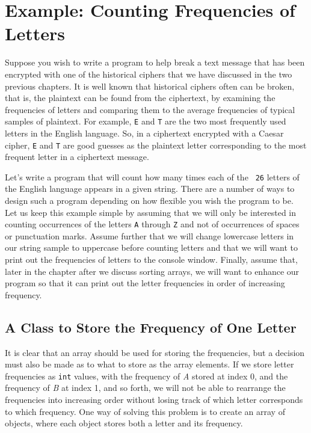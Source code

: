 \section{Example: Counting Frequencies of Letters}
\noindent Suppose you wish to write a program to help break a text
message that has been encrypted with one of the historical ciphers
that we have discussed in the two previous chapters.  It is well known
that historical ciphers often can be broken, that is, the plaintext
can be found from the ciphertext, by examining the frequencies of
letters and comparing them to the average frequencies of typical
samples of plaintext.  For example, {\tt E} and {\tt T} are the two
most frequently used letters in the English language. So, in a
ciphertext encrypted with a Caesar cipher, {\tt E} and {\tt T} are
good guesses as the plaintext letter corresponding to the most
frequent letter in a ciphertext message.

Let's write a program that will count how many times each of the {\tt
26} letters of the English language appears in a given string.  There
are a number of ways to design such a program depending on how
flexible you wish the program to be.  Let us keep this example simple
by assuming that we will only be interested in counting occurrences of
the letters {\tt A} through {\tt Z} and not of occurrences of spaces
or punctuation marks.  Assume further that we will change lowercase
letters in our string sample to uppercase before counting letters and
that we will want to print out the frequencies of letters to the
console window.  Finally, assume that, later in the chapter after we
discuss sorting arrays, we will want to enhance our program so that it
can print out the letter frequencies in order of increasing frequency.

\subsection{A Class to Store the Frequency of One Letter}

\noindent It is clear that an array should be used for storing the
frequencies, but a decision must also be made as to what to store as the
array elements.  If we store letter frequencies as {\tt int} values,
with the frequency of {\em A} stored at index 0, and the frequency of
{\em B} at index 1, and so forth, we will not be able to rearrange the
frequencies into increasing order without losing track of which letter
corresponds to which frequency.  One way of solving this problem is to
create an array of objects, where each object stores both a letter and
its frequency.

